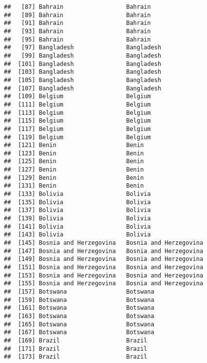 \documentclass[]{article}
\begin{document}
\begin{verbatim}
##   [87] Bahrain                  Bahrain                 
##   [89] Bahrain                  Bahrain                 
##   [91] Bahrain                  Bahrain                 
##   [93] Bahrain                  Bahrain                 
##   [95] Bahrain                  Bahrain                 
##   [97] Bangladesh               Bangladesh              
##   [99] Bangladesh               Bangladesh              
##  [101] Bangladesh               Bangladesh              
##  [103] Bangladesh               Bangladesh              
##  [105] Bangladesh               Bangladesh              
##  [107] Bangladesh               Bangladesh              
##  [109] Belgium                  Belgium                 
##  [111] Belgium                  Belgium                 
##  [113] Belgium                  Belgium                 
##  [115] Belgium                  Belgium                 
##  [117] Belgium                  Belgium                 
##  [119] Belgium                  Belgium                 
##  [121] Benin                    Benin                   
##  [123] Benin                    Benin                   
##  [125] Benin                    Benin                   
##  [127] Benin                    Benin                   
##  [129] Benin                    Benin                   
##  [131] Benin                    Benin                   
##  [133] Bolivia                  Bolivia                 
##  [135] Bolivia                  Bolivia                 
##  [137] Bolivia                  Bolivia                 
##  [139] Bolivia                  Bolivia                 
##  [141] Bolivia                  Bolivia                 
##  [143] Bolivia                  Bolivia                 
##  [145] Bosnia and Herzegovina   Bosnia and Herzegovina  
##  [147] Bosnia and Herzegovina   Bosnia and Herzegovina  
##  [149] Bosnia and Herzegovina   Bosnia and Herzegovina  
##  [151] Bosnia and Herzegovina   Bosnia and Herzegovina  
##  [153] Bosnia and Herzegovina   Bosnia and Herzegovina  
##  [155] Bosnia and Herzegovina   Bosnia and Herzegovina  
##  [157] Botswana                 Botswana                
##  [159] Botswana                 Botswana                
##  [161] Botswana                 Botswana                
##  [163] Botswana                 Botswana                
##  [165] Botswana                 Botswana                
##  [167] Botswana                 Botswana                
##  [169] Brazil                   Brazil                  
##  [171] Brazil                   Brazil                  
##  [173] Brazil                   Brazil                  

\end{verbatim}
\end{document}
